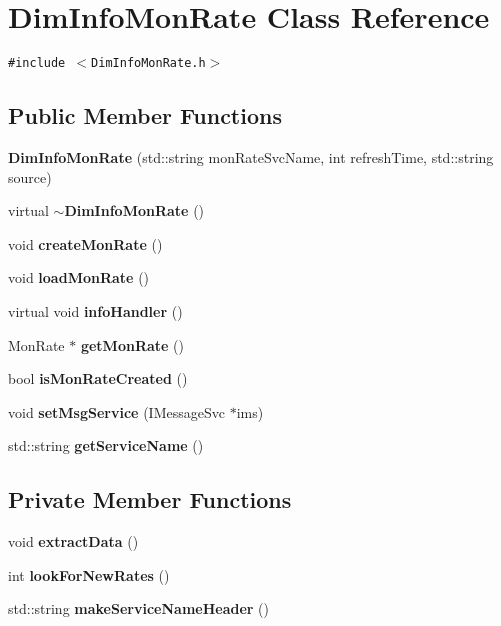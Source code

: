 \section{Dim\-Info\-Mon\-Rate Class Reference}
\label{classDimInfoMonRate}
{\tt \#include $<$Dim\-Info\-Mon\-Rate.h$>$}

\subsection*{Public Member Functions}
\begin{CompactItemize}
\item 
{\bf Dim\-Info\-Mon\-Rate} (std::string mon\-Rate\-Svc\-Name, int refresh\-Time, std::string source)
\item 
virtual {\bf $\sim$Dim\-Info\-Mon\-Rate} ()
\item 
void {\bf create\-Mon\-Rate} ()
\item 
void {\bf load\-Mon\-Rate} ()
\item 
virtual void {\bf info\-Handler} ()
\item 
Mon\-Rate $\ast$ {\bf get\-Mon\-Rate} ()
\item 
bool {\bf is\-Mon\-Rate\-Created} ()
\item 
void {\bf set\-Msg\-Service} (IMessage\-Svc $\ast$ims)
\item 
std::string {\bf get\-Service\-Name} ()
\end{CompactItemize}
\subsection*{Private Member Functions}
\begin{CompactItemize}
\item 
void {\bf extract\-Data} ()
\item 
int {\bf look\-For\-New\-Rates} ()
\item 
std::string {\bf make\-Service\-Name\-Header} ()
\end{CompactItemize}
